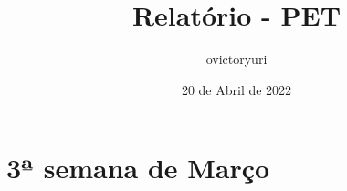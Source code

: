 \documentclass{article}
\title {Relatório - PET}
\author{ovictoryuri}
\date {20 de Abril de 2022}
\begin{document}
	
\maketitle
	
\section{3ª semana de Março}
\end{document}
